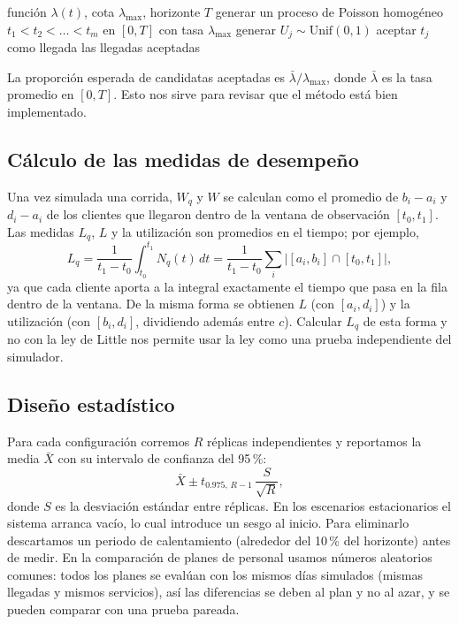 \documentclass[11pt,letterpaper]{article}
\begin{document}
\begin{algorithm}[H]
\caption{\emph{Thinning} para un proceso de Poisson no homogéneo}
\label{alg:thinning}
\begin{algorithmic}[1]
\Require función $\lambda(t)$, cota $\lambda_{\max}$, horizonte $T$
\State generar un proceso de Poisson homogéneo $t_1 < t_2 < \dots < t_m$ en $[0,T]$ con tasa $\lambda_{\max}$
  \State generar $U_j \sim \text{Unif}(0,1)$
    \State aceptar $t_j$ como llegada
  \EndIf
\EndFor
\State \Return las llegadas aceptadas
\end{algorithmic}
\end{algorithm}

La proporción esperada de candidatas aceptadas es
$\bar{\lambda}/\lambda_{\max}$, donde $\bar\lambda$ es la tasa promedio en $[0,T]$. Esto
nos sirve para revisar que el método está bien implementado.

\subsection{Cálculo de las medidas de desempeño}
Una vez simulada una corrida, $W_q$ y $W$ se calculan como el promedio de
$b_i - a_i$ y $d_i - a_i$ de los clientes que llegaron dentro de la ventana de
observación $[t_0, t_1]$. Las medidas $L_q$, $L$ y la utilización son promedios en el
tiempo; por ejemplo,
\begin{equation}
  L_q = \frac{1}{t_1 - t_0}\int_{t_0}^{t_1} N_q(t)\,dt
      = \frac{1}{t_1 - t_0}\sum_i \bigl|[a_i, b_i] \cap [t_0, t_1]\bigr| ,
\end{equation}
ya que cada cliente aporta a la integral exactamente el tiempo que pasa en la fila dentro
de la ventana. De la misma forma se obtienen $L$ (con $[a_i,d_i]$) y la utilización (con
$[b_i,d_i]$, dividiendo además entre $c$). Calcular $L_q$ de esta forma y no con la ley de
Little nos permite usar la ley como una prueba independiente del simulador.

\subsection{Diseño estadístico}
Para cada configuración corremos $R$ réplicas independientes y reportamos la media
$\bar{X}$ con su intervalo de confianza del 95\,\%:
\begin{equation}
  \bar{X} \pm t_{0.975,\,R-1}\,\frac{S}{\sqrt{R}},
\end{equation}
donde $S$ es la desviación estándar entre réplicas. En los escenarios estacionarios el
sistema arranca vacío, lo cual introduce un sesgo al inicio. Para eliminarlo descartamos
un periodo de calentamiento (alrededor del 10\,\% del horizonte) antes de medir. En la
comparación de planes de personal usamos números aleatorios comunes: todos los planes se
evalúan con los mismos días simulados (mismas llegadas y mismos servicios), así las
diferencias se deben al plan y no al azar, y se pueden comparar con una prueba pareada.
\end{document}
